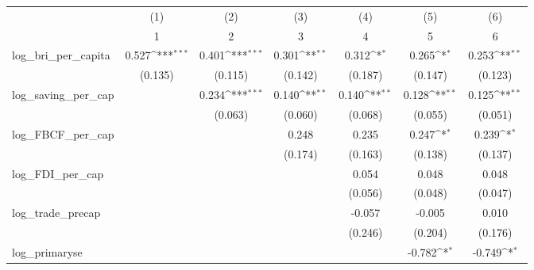 {
\def\sym#1{\ifmmode^{#1}\else\(^{#1}\)\fi}
\begin{tabular}{l*{6}{c}}
\toprule
            &\multicolumn{1}{c}{(1)}&\multicolumn{1}{c}{(2)}&\multicolumn{1}{c}{(3)}&\multicolumn{1}{c}{(4)}&\multicolumn{1}{c}{(5)}&\multicolumn{1}{c}{(6)}\\
            &\multicolumn{1}{c}{1}&\multicolumn{1}{c}{2}&\multicolumn{1}{c}{3}&\multicolumn{1}{c}{4}&\multicolumn{1}{c}{5}&\multicolumn{1}{c}{6}\\
\midrule
log\_bri\_per\_capita&       0.527\sym{***}&       0.401\sym{***}&       0.301\sym{**} &       0.312\sym{*}  &       0.265\sym{*}  &       0.253\sym{**} \\
            &     (0.135)         &     (0.115)         &     (0.142)         &     (0.187)         &     (0.147)         &     (0.123)         \\
\addlinespace
log\_saving\_per\_cap&                     &       0.234\sym{***}&       0.140\sym{**} &       0.140\sym{**} &       0.128\sym{**} &       0.125\sym{**} \\
            &                     &     (0.063)         &     (0.060)         &     (0.068)         &     (0.055)         &     (0.051)         \\
\addlinespace
log\_FBCF\_per\_cap&                     &                     &       0.248         &       0.235         &       0.247\sym{*}  &       0.239\sym{*}  \\
            &                     &                     &     (0.174)         &     (0.163)         &     (0.138)         &     (0.137)         \\
\addlinespace
log\_FDI\_per\_cap&                     &                     &                     &       0.054         &       0.048         &       0.048         \\
            &                     &                     &                     &     (0.056)         &     (0.048)         &     (0.047)         \\
\addlinespace
log\_trade\_precap&                     &                     &                     &      -0.057         &      -0.005         &       0.010         \\
            &                     &                     &                     &     (0.246)         &     (0.204)         &     (0.176)         \\
\addlinespace
log\_primaryse&                     &                     &                     &                     &      -0.782\sym{*}  &      -0.749\sym{*}  \\

\end{tabular}}
